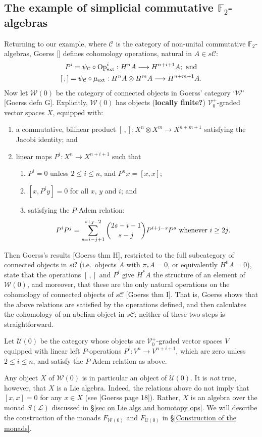 \documentclass[11pt]{amsart}
\theoremstyle{plain}
\theoremstyle{definition}
\renewcommand{\to}{\longrightarrow}
\newcommand{\scrL}{\mathscr{L}}
\newcommand{\calW}{\mathcal{W}}
\newcommand{\calU}{\mathcal{U}}
\newcommand{\calC}{\mathcal{C}}
\newcommand{\calV}{\mathcal{V}}
\theoremstyle{plain}
\newcommand{\LieOperad}{{\scrL}}
\newcommand{\vect}[2]{\calV^{#1}_{#2}}
\newcommand{\ExtCohOp}{\textup{Op}_\textup{ext}}
\newcommand{\ExtCohProd}{\mu_\textup{ext}}
\newcommand{\F}{\mathbb{F}}
\begin{document}
\begin{Conventions and notation}
\subsection{The example of simplicial commutative $\F_2$-algebras}\label{The example of simplicial commutative F2-algebras}
Returning to our example, where $\calC$ is the category of non-unital commutative $\F_2$-algebras, Goerss [] defines cohomology operations, natural in $A\in s\calC$:
\begin{gather*}
P^i=\psi_\calC\circ\ExtCohOp^i:H^nA\to H^{n+i+1}A;\textup{ and}\\
[\,,]=\psi_\calC\circ\ExtCohProd :H^nA\otimes H^mA\to H^{n+m+1}A.
\end{gather*}
Now let $\calW(0)$ be the category of connected objects in Goerss' category `$\calW$' [Goerss defn G]. Explicitly, $\calW(0)$ has objects (\textbf{locally finite?}) $\vect{+}{0}$-graded vector spaces $X$, equipped with:
\begin{enumerate}
\item a commutative, bilinear product $[\,,]:X^n\otimes X^m\to X^{n+m+1}$ satisfying the Jacobi identity; and
\item linear maps $P^i:X^n\to X^{n+i+1}$ such that
\begin{enumerate}
\item $P^i=0$ unless $2\leq i\leq n$, and $P^nx=[x,x]$;
\item $[x,P^iy]=0$ for all $x$, $y$ and $i$; and
\item satisfying the $P$-Adem relation:
\[P^iP^j=\sum_{s=i-j+1}^{i+j-2}{2s-i-1\choose s-j}P^{i+j-s}P^s\textup{ whenever $i\geq 2j$.}\]
\end{enumerate}
\end{enumerate}
Then Goerss's results [Goerss thm H], restricted to the full subcategory of connected objects in $s\calC$ (i.e.\ objects $A$ with $\pi_*A=0$, or equivalently $H^0A=0$), state that the operations $[\,,]$ and $P^i$ give $H^*A$ the structure of an element of $\calW(0)$, and moreover, that these are the only natural operations on the cohomology of connected objects of $s\calC$ [Goerss thm I]. That is, Goerss shows that the above relations are satisfied by the operations defined, and then calculates the cohomology of an abelian object in $s\calC$; neither of these two steps is straightforward.

Let $\calU(0)$ be the category whose objects are $\vect{+}{0}$-graded vector spaces $V$ equipped with linear left $P$-operations $P^i:V^n\to V^{n+i+1}$, which are zero unless  $2\leq i\leq n$, and satisfy the $P$-Adem relation as above.

Any object $X$ of $\calW(0)$ is in particular an object of $\calU(0)$. It is \emph{not} true, however, that $X$ is a Lie algebra. Indeed, the relations above do not imply that $[x,x]=0$ for any $x\in X$ (see [Goerss page 18]). Rather, $X$ is an algebra over the monad $S(\LieOperad)$ discussed in \S\ref{sec on Lie algs and homotopy ops}. We will describe the construction of the monads $F_{\calW(0)}$ and $F_{\calU(0)}$ in \S\ref{Construction of the monads}.



\end{Conventions and notation}
\end{document}
